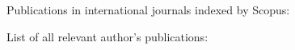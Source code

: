Publications in international journals indexed by Scopus:
\begin{refsection}
\nocite{*}
\printbibliography[
    keyword=scopus,
    heading=none,
    resetnumbers=true
]
\end{refsection}


List of all relevant author's publications:
\begin{refsection}
\nocite{*}
\printbibliography[
    keyword=own,
    heading=none,
    resetnumbers=true
]
\end{refsection}